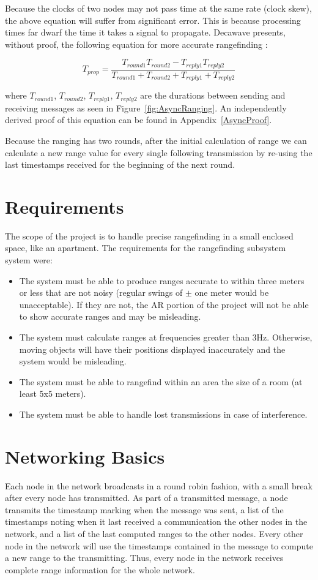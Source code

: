 Because the clocks of two nodes may not pass time at the same rate (clock skew), the above equation will suffer from significant error. This is because processing times far dwarf the time it takes a signal to propagate. Decawave presents, without proof, the following equation for more accurate rangefinding \cite{DW1000UserManual}:

\[
	T_{prop} = \frac{T_{round1}  T_{round2} - T_{reply1} T_{reply2}}{T_{round1} + T_{round2} + T_{reply1} + T_{reply2}}
\]

where $T_{round1}$, $T_{round2}$, $T_{reply1}$, $T_{reply2}$ are the durations between sending and receiving messages as seen in Figure~\ref{fig:AsyncRanging}. An independently derived proof of this equation can be found in Appendix~\ref{AsyncProof}.

Because the ranging has two rounds, after the initial calculation of range we can calculate a new range value for every single following transmission by re-using the last timestamps received for the beginning of the next round.

\section{Requirements}
The scope of the project is to handle precise rangefinding in a small enclosed space, like an apartment. The requirements for the rangefinding subsystem system were:
\begin{itemize}
	\item The system must be able to produce ranges accurate to within three meters or less that are not noisy (regular swings of $\pm$ one meter would be unacceptable). If they are not, the AR portion of the project will not be able to show accurate ranges and may be misleading.
	\item The system must calculate ranges at frequencies greater than 3Hz. Otherwise, moving objects will have their positions displayed inaccurately and the system would be misleading.
	\item The system must be able to rangefind within an area the size of a room (at least 5x5 meters). 
	\item The system must be able to handle lost transmissions in case of interference. 
\end{itemize}

\section{Networking Basics}
Each node in the network broadcasts in a round robin fashion, with a small break after every node has transmitted. As part of a transmitted message, a node transmits the timestamp marking when the message was sent, a list of the timestamps noting when it last received a communication the other nodes in the network, and a list of the last computed ranges to the other nodes. Every other node in the network will use the timestamps contained in the message to compute a new range to the transmitting. Thus, every node in the network receives complete range information for the whole network.

